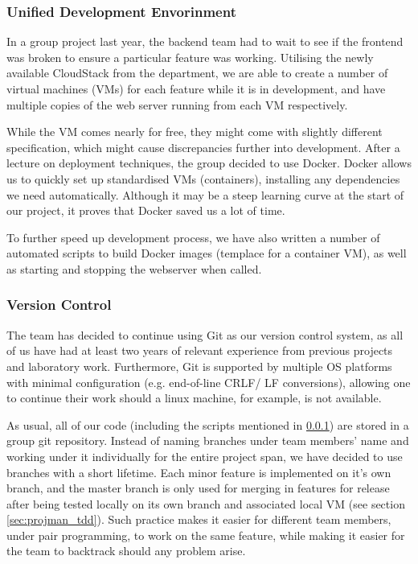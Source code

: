 ﻿\documentclass[a4paper, titlepage]{article}
\begin{document}
\subsubsection{Unified Development Envorinment} \label{sec:projman_devenv}


In a group project last year, the backend team had to wait to see if the frontend was broken to ensure a 
particular feature was working. Utilising the newly available CloudStack from the department,
we are able to create a number of virtual machines (VMs) for each feature while it is in development,
and have multiple copies of the web server running from each VM respectively.

While the VM comes nearly for free, they might come with slightly different specification,
which might cause discrepancies further into development. After a lecture on deployment techniques, the group decided to use Docker. Docker allows us to quickly set up standardised VMs (containers), installing any dependencies we need automatically. Although it may be a steep learning curve at the start of our project, it proves that Docker saved us a lot of time.

To further speed up development process, we have also written a number of automated scripts
to build Docker images (templace for a container VM), as well as starting and stopping the
webserver when called.

\subsubsection{Version Control}
The team has decided to continue using Git as our version control system, as all of us have had
at least two years of relevant experience from previous projects and laboratory work. Furthermore,
Git is supported by multiple OS platforms with minimal configuration (e.g. end-of-line CRLF/ LF conversions),
allowing one to continue their work should a linux machine, for example, is not available.

As usual, all of our code (including the scripts mentioned in \ref{sec:projman_devenv}) 
are stored in a group git repository. Instead of naming branches under team members'
name and working under it individually for the entire project span, we have decided to use branches with a short lifetime.
Each minor feature is implemented on it's own branch, and the master branch is only used for merging in features for release
after being tested locally on its own branch and associated local VM (see section \ref{sec:projman_tdd}).
Such practice makes it easier for different team members, under pair programming, to work on the same feature,
while making it easier for the team to backtrack should any problem arise.
\end{document}
